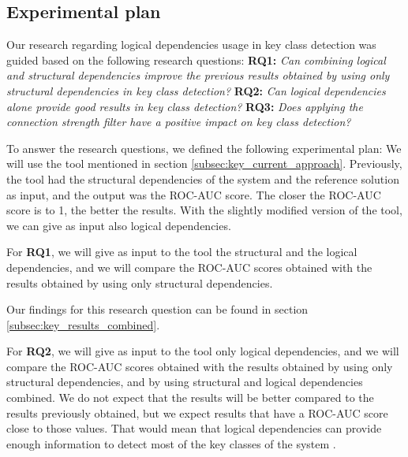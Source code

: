 \subsection{Experimental plan}
\label{subsec:key_plan}

\hspace{4em}Our research regarding logical dependencies usage in key class detection was guided based on the following research questions: \textbf{RQ1:} \textit{Can combining logical and structural dependencies improve the previous results obtained by using only structural dependencies in key class detection?} \textbf{RQ2:} \textit{Can logical dependencies alone provide good results in key class detection?} \textbf{RQ3:} \textit{Does applying the connection strength filter have a positive impact on key class detection?}

To answer the research questions, we defined the following experimental plan: 
We will use the tool mentioned in section \ref{subsec:key_current_approach}. Previously, the tool had the structural dependencies of the system and the reference solution as input, and the output was the ROC-AUC score. The closer the ROC-AUC score is to 1, the better the results. With the slightly modified version of the tool, we can give as input also logical dependencies.


For \textbf {RQ1}, we will give as input to the tool the structural and the logical dependencies, and we will compare the ROC-AUC scores obtained with the results obtained by using only structural dependencies.


\noindent{}
\medskip

Our findings for this research question can be found in section \ref{subsec:key_results_combined}.


For \textbf {RQ2}, we will give as input to the tool only logical dependencies, and we will compare the ROC-AUC scores obtained with the results obtained by using only structural dependencies, and by using structural and logical dependencies combined.
We do not expect that the results will be better compared to the results previously obtained, but we expect results that have a ROC-AUC score close to those values. That would mean that logical dependencies can provide enough information to detect most of the key classes of the system \cite{b4}.

